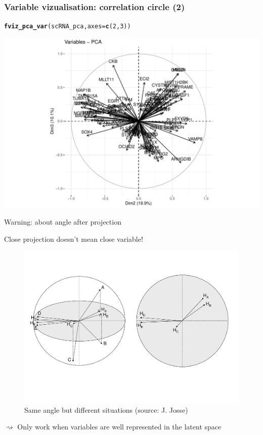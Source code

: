 \documentclass{beamer}\usepackage[]{graphicx}\usepackage[]{color}
\makeatletter
\newcommand{\hlnum}[1]{\textcolor[rgb]{0.686,0.059,0.569}{#1}}%
\newcommand{\hlstd}[1]{\textcolor[rgb]{0.345,0.345,0.345}{#1}}%
\newcommand{\hlkwc}[1]{\textcolor[rgb]{0.333,0.667,0.333}{#1}}%
\newcommand{\hlkwd}[1]{\textcolor[rgb]{0.737,0.353,0.396}{\textbf{#1}}}%
\newenvironment{kframe}{%
 \def\at@end@of@kframe{}%
 \ifinner\ifhmode%
  \def\at@end@of@kframe{\end{minipage}}%
  \begin{minipage}{\columnwidth}%
 \fi\fi%
 \def\FrameCommand##1{\hskip\@totalleftmargin \hskip-\fboxsep
 \colorbox{shadecolor}{##1}\hskip-\fboxsep
     \hskip-\linewidth \hskip-\@totalleftmargin \hskip\columnwidth}%
 \MakeFramed {\advance\hsize-\width
   \@totalleftmargin\z@ \linewidth\hsize
   \@setminipage}}%
 {\par\unskip\endMakeFramed%
 \at@end@of@kframe}
\newenvironment{knitrout}{}{} %
\makeatother
\begin{document}
\begin{frame}[fragile]
  \frametitle{Variable vizualisation: correlation circle (2)}

\begin{knitrout}\scriptsize
{}\color{fgcolor}\begin{kframe}
\begin{alltt}
\hlkwd{fviz_pca_var}\hlstd{(scRNA_pca,} \hlkwc{axes} \hlstd{=} \hlkwd{c}\hlstd{(}\hlnum{2}\hlstd{,}\hlnum{3}\hlstd{))}
\end{alltt}
\end{kframe}
\includegraphics[width=.8\textwidth]{figures/pca_crabs_varmap2-1} 
\end{knitrout}

\end{frame}

\begin{frame}{Warning: about angle after projection}

  \alert{Close projection doesn't mean close variable!}

  \begin{figure}
    \includegraphics[width = .85\textwidth]{proj_var_acp}
    \caption{Same angle but different situations {\tiny (source: J. Josse)}}

  \end{figure}

 $\rightsquigarrow$ Only work when variables are well represented in the latent space
\end{frame}
\end{document}
